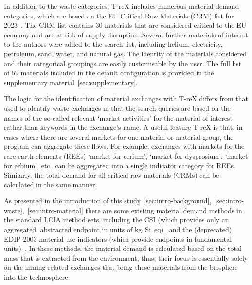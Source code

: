 In addition to the waste categories, T-reX includes numerous material demand categories, which are based on the EU Critical Raw Materials (CRM) list for 2023~\citep{eu2023crmstudy}. The CRM list contains 30 materials that are considered critical to the EU economy and are at risk of supply disruption. Several further materials of interest to the authors were added to the search list, including helium, electricity, petroleum, sand, water, and natural gas. The identity of the materials considered and their categorical groupings are easily customisable by the user. The full list of 59 materials included in the default configuration is provided in the supplementary material~\autoref{sec:supplementary}.

The logic for the identification of material exchanges with T-reX differs from that used to identify waste exchanges in that the search queries are based on the names of the so-called relevant `market activities' for the material of interest rather than keywords in the exchange's name. A useful feature T-reX is that, in cases where there are several markets for one material or material group, the program can aggregate these flows. For example, exchanges with markets for the rare-earth-elements (REEs) `market for cerium', `market for dysprosium', `market for erbium', etc.\ can be aggregated into a single indicator category for REEs. Similarly, the total demand for all critical raw materials (CRMs) can be calculated in the same manner.

As presented in the introduction of this study~\autoref{sec:intro-background},~\autoref{sec:intro-waste},~\autoref{sec:intro-material} there are some existing material demand methods in the standard LCIA method sets, including the CSI (which provides only an aggregated, abstracted endpoint in units of kg~Si~eq)~\citep{arvidsson2020csi} and the (deprecated) EDIP 2003 material use indicators (which provide endpoints in fundamental units)~\citep{hauschild2003edip}. In these methods, the material demand is calculated based on the total mass that is extracted from the environment, thus, their focus is essentially solely on the mining-related exchanges that bring these materials from the biosphere into the technosphere.

